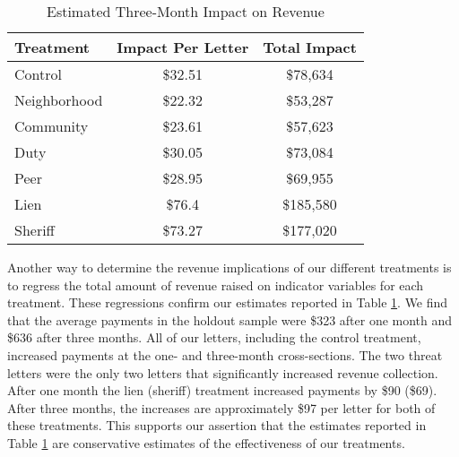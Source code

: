 \documentclass[12pt]{article}
\begin{document}
\begin{table}[htbp]
\caption{Estimated Three-Month Impact on Revenue}\label{sh_rev}
\bigskip
\centering
\begin{tabular}{lcc}
  \hline
Treatment & Impact Per Letter & Total Impact \\ 
  \hline
Control & \$32.51 & \$78,634 \\ 
  Neighborhood & \$22.32 & \$53,287 \\ 
  Community & \$23.61 & \$57,623 \\ 
  Duty & \$30.05 & \$73,084 \\ 
  Peer & \$28.95 & \$69,955 \\ 
  Lien & \$76.4 & \$185,580 \\ 
  Sheriff & \$73.27 & \$177,020 \\ 
   \hline
\end{tabular}
\end{table}

Another way to determine the revenue implications of our different
treatments is to regress the total amount of revenue raised on
indicator variables for each treatment.  These regressions confirm our
estimates reported in Table \ref{sh_rev}. We find that the average
payments in the holdout sample were \$323 after one month and \$636
after three months. All of our letters, including the control
treatment, increased payments at the one- and three-month
cross-sections. The two threat letters were the only two letters that
significantly increased revenue collection. After one month the lien
(sheriff) treatment increased payments by \$90 (\$69). After three
months, the increases are approximately \$97 per letter for both of
these treatments.  This supports our assertion that the estimates
reported in Table \ref{sh_rev} are conservative estimates of the
effectiveness of our treatments.
\end{document}
